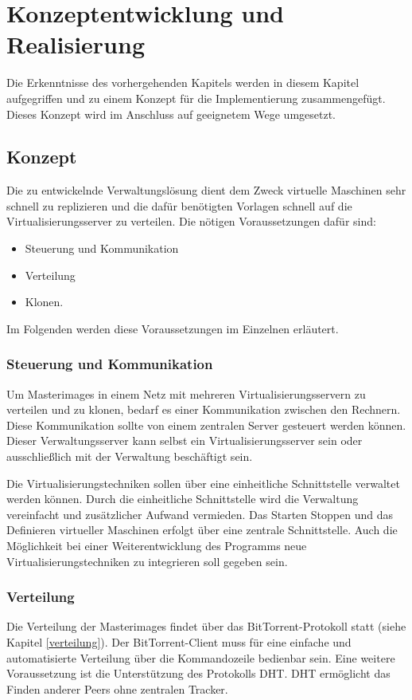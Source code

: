 \chapter{Konzeptentwicklung und Realisierung}
Die Erkenntnisse des vorhergehenden Kapitels werden in diesem Kapitel aufgegriffen und zu einem Konzept für die Implementierung zusammengefügt. Dieses Konzept wird im Anschluss auf geeignetem Wege umgesetzt.
\section{Konzept}
Die zu entwickelnde Verwaltungslösung dient dem Zweck virtuelle Maschinen sehr schnell zu replizieren und die dafür benötigten Vorlagen schnell auf die Virtualisierungsserver zu verteilen. Die nötigen Voraussetzungen dafür sind:
\begin{itemize}
\item{Steuerung und Kommunikation}
\item{Verteilung}
\item{Klonen.}
\end{itemize}
Im Folgenden werden diese Voraussetzungen im Einzelnen erläutert.

\subsection{Steuerung und Kommunikation}
Um Masterimages in einem Netz mit mehreren Virtualisierungsservern zu verteilen und zu klonen, bedarf es einer Kommunikation zwischen den Rechnern. Diese Kommunikation sollte von einem zentralen Server gesteuert werden können. Dieser Verwaltungsserver kann selbst ein Virtualisierungsserver sein oder ausschließlich mit der Verwaltung beschäftigt sein.

Die Virtualisierungstechniken sollen über eine einheitliche Schnittstelle verwaltet werden können. Durch die einheitliche Schnittstelle wird die Verwaltung vereinfacht und zusätzlicher Aufwand vermieden. Das Starten Stoppen und das Definieren virtueller Maschinen erfolgt über eine zentrale Schnittstelle. Auch die Möglichkeit bei einer Weiterentwicklung des Programms neue Virtualisierungstechniken zu integrieren soll gegeben sein.

\subsection{Verteilung}
Die Verteilung der Masterimages findet über das BitTorrent-Protokoll statt (siehe Kapitel \ref{verteilung}). Der BitTorrent-Client muss für eine einfache und automatisierte Verteilung über die Kommandozeile bedienbar sein. Eine weitere Voraussetzung ist die Unterstützung des Protokolls DHT. DHT ermöglicht das Finden anderer Peers ohne zentralen Tracker. %

